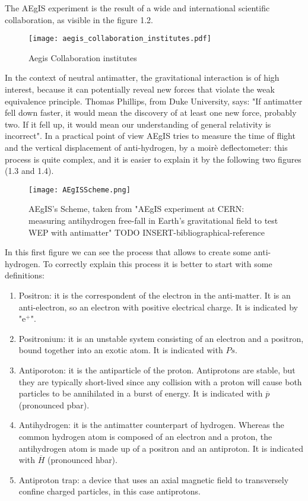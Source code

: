 The AEgIS experiment is the result of a wide and international scientific collaboration, as visible in the figure 1.2.

\begin{figure}[H]
\centering 
\texttt{[image: aegis\_collaboration\_institutes.pdf]} 
\caption{Aegis Collaboration institutes}
\end{figure}


In the context of neutral antimatter, the gravitational interaction is of high interest, because it can potentially reveal new forces that violate the weak equivalence principle. Thomas Phillips, from Duke University, says: "If antimatter fell down faster, it would mean the discovery of at least one new force, probably two. If it fell up, it would mean our understanding of general relativity is incorrect". In a practical point of view AEgIS tries to measure the time of flight and the vertical displacement of anti-hydrogen, by a moirè deflectometer: this process is quite complex, and it is easier to explain it by the following two figures (1.3 and 1.4).

\begin{figure}[H]
\centering 
\texttt{[image: AEgISScheme.png]} 
\caption{AEgIS's Scheme, taken from "AEgIS experiment at CERN: measuring antihydrogen free-fall in Earth’s gravitational field to test WEP with antimatter" TODO INSERT-bibliographical-reference}
\end{figure}

In this first figure we can see the process that allows to create some anti-hydrogen. To correctly explain this process it is better to start with some definitions:


\begin{enumerate}

\item Positron: it is the correspondent of the electron in the anti-matter. It is an anti-electron, so an electron with positive electrical charge. It is indicated by "e$^{+}$".

\item Positronium: it is an unstable system consisting of an electron and a positron, bound together into an exotic atom. It is indicated with $ {Ps} $.

\item Antiporoton: it is the antiparticle of the proton. Antiprotons are stable, but they are typically short-lived since any collision with a proton will cause both particles to be annihilated in a burst of energy. It is indicated with $ \overline{p} $ (pronounced pbar).

\item Antihydrogen: it is the antimatter counterpart of hydrogen. Whereas the common hydrogen atom is composed of an electron and a proton, the antihydrogen atom is made up of a positron and an antiproton. It is indicated with $ \overline{H} $ (pronounced hbar).


\item Antiproton trap: a device that uses an axial magnetic field to transversely confine charged particles, in this case antiprotons.


\end{enumerate}

